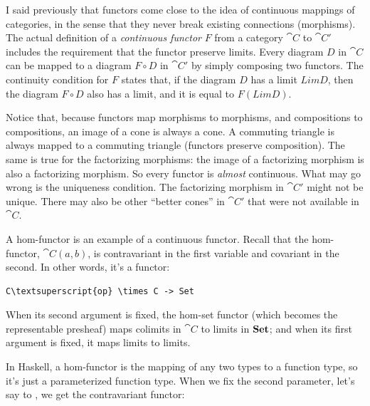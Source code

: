 I said previously that functors come close to the idea of continuous
mappings of categories, in the sense that they never break existing
connections (morphisms). The actual definition of a \emph{continuous
functor} $F$ from a category $\cat{C}$ to $\cat{C'}$ includes the
requirement that the functor preserve limits. Every diagram $D$
in $\cat{C}$ can be mapped to a diagram $F \circ D$ in $\cat{C'}$ by
simply composing two functors. The continuity condition for $F$
states that, if the diagram $D$ has a limit $Lim D$, then
the diagram $F \circ D$ also has a limit, and it is equal to
$F (Lim D)$.

\begin{figure}[H]
\centering
{}
\end{figure}

\noindent
Notice that, because functors map morphisms to morphisms, and
compositions to compositions, an image of a cone is always a cone. A
commuting triangle is always mapped to a commuting triangle (functors
preserve composition). The same is true for the factorizing morphisms:
the image of a factorizing morphism is also a factorizing morphism. So
every functor is \emph{almost} continuous. What may go wrong is the
uniqueness condition. The factorizing morphism in $\cat{C'}$ might not be
unique. There may also be other ``better cones'' in $\cat{C'}$ that were
not available in $\cat{C}$.

A hom-functor is an example of a continuous functor. Recall that the
hom-functor, $\cat{C}(a, b)$, is contravariant in the first variable
and covariant in the second. In other words, it's a functor:

\begin{Verbatim}[commandchars=\\\{\}]
C\textsuperscript{op} \times C -> Set
\end{Verbatim}
When its second argument is fixed, the hom-set functor (which becomes
the representable presheaf) maps colimits in $\cat{C}$ to limits in
$\mathbf{Set}$; and when its first argument is fixed, it maps limits to
limits.

In Haskell, a hom-functor is the mapping of any two types to a function
type, so it's just a parameterized function type. When we fix the second
parameter, let's say to , we get the contravariant
functor:

